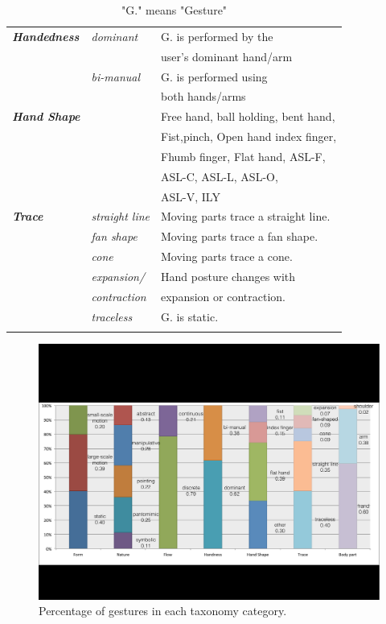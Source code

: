 \documentclass{sigchi}
\begin{document}
\begin{table}
\begin{adjustwidth}{-0.4cm}{}
\begin{tabular}{|l|l|l|}
    \textit{\textbf {Handedness}} & {\it dominant} & G. is performed by the \\&&user's dominant hand/arm \\ \cline{2-3}
    &{\it bi-manual}&G. is performed using \\&&both hands/arms\\
    \Xhline{4\arrayrulewidth}
    \textit{\textbf {Hand Shape}} &&Free hand, ball holding, bent hand,\\&& Fist,pinch, Open hand
    index finger,\\&&Fhumb finger, Flat hand, ASL-F,\\&&ASL-C, ASL-L, ASL-O, \\&&ASL-V, ILY\\
    \Xhline{4\arrayrulewidth}
    \textit{\textbf {Trace}}&{\it straight line}&Moving parts trace a straight line.\\ \cline{2-3}
    &{\it fan shape}&Moving parts trace a fan shape.\\ \cline{2-3}
    &{\it cone}&Moving parts trace a cone.\\ \cline{2-3}
    &{\it expansion/}&Hand posture changes with \\&{\it contraction}&expansion or contraction.\\
     \cline{2-3}
    &{\it traceless}&G. is static.\\
    \Xhline{4\arrayrulewidth}
  \end{tabular}
  \caption{"G." means "Gesture"}
  \label{tab:classificationTable}
  \end{adjustwidth}
\end{table}

\begin{figure}[!h]
\centering
\includegraphics[width=2\columnwidth]{taxonomy.pdf}
\caption{Percentage of gestures in each taxonomy category.}
\label{fig:taxonomyFigure}
\end{figure}
\end{document}
